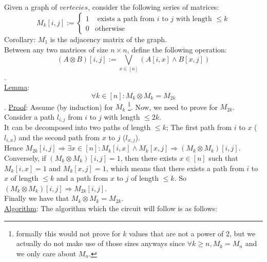 \subsection{}
Given a graph of $vertecies$, 
consider the following series of matrices:\\
\[
	M_k[i,j]:=
	\begin{cases}
		1 & \text{ exists a path from } i \text{ to } j \text{ with length } \leq k\\
		0 & \text{otherwise}
	\end{cases}
\]
Corollary: $M_1$ is the adjacency matrix of the graph.\\
Between any two matrices of size $n\times n$, define the following operation:
\[(A\otimes B)[i,j]:=\bigvee_{x\in [n]}\left(A[i, x]\wedge B[x, j]\right)\].\\

\underline{Lemma}:
\[\forall k\in[n]: M_k\otimes M_k=M_{2k}\].
\underline{Proof}:
Assume (by induction) for $M_k$
\footnote{formally this would not prove for
$k$ values that are not a power of $2$,
but we actually do not make use of those sizes anyways
since $\forall k\geq n, M_k=M_n$ and we only care about $M_n$.}.
Now, we need to prove for $M_{2k}$. Consider a path $l_{i,j}$
from $i$ to $j$ with length $\leq 2k$.\\
It can be decomposed into two paths of length $\leq k$;
The first path from $i$ to $x$ ($l_{i,x}$) and the second path from $x$ to $j$ ($l_{x,j}$).\\
Hence $M_{2k}[i,j]\Rightarrow \exists x\in[n]: M_k[i,x]\wedge M_k[x,j]\Rightarrow (M_k\otimes M_k)[i,j]$.\\
Conversely, if $(M_k\otimes M_k)[i,j]=1$, then there exists $x\in[n]$ such that $M_k[i,x]=1$ and $M_k[x,j]=1$,
which means that there exists a path from $i$ to $x$ of length $\leq k$ and a path from $x$ to $j$ of length $\leq k$.
So $(M_k\otimes M_k)[i,j]\Rightarrow M_{2k}[i,j]$.\\
Finally we have that $M_{k}\otimes M_{k}=M_{2k}$.\\

\underline{Algorithm}:
The algorithm which the circuit will follow is as follows:\\
